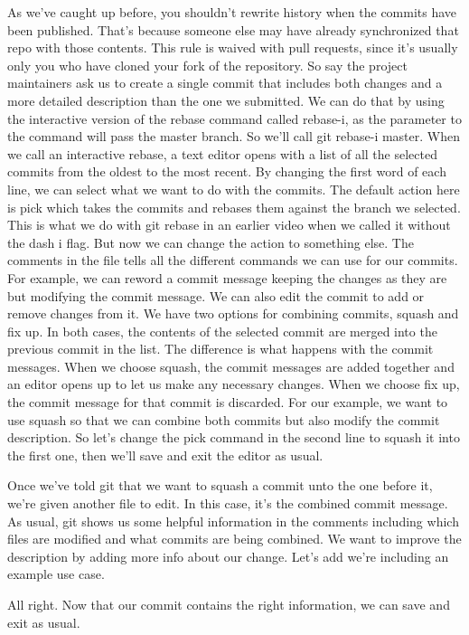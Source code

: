 	
	As we've caught up before, you shouldn't rewrite history when the commits have been published. That's because someone else may have already synchronized that repo with those contents. This rule is waived with pull requests, since it's usually only you who have cloned your fork of the repository. So say the project maintainers ask us to create a single commit that includes both changes and a more detailed description than the one we submitted. We can do that by using the interactive version of the rebase command called rebase-i, as the parameter to the command will pass the master branch. So we'll call git rebase-i master. When we call an interactive rebase, a text editor opens with a list of all the selected commits from the oldest to the most recent. By changing the first word of each line, we can select what we want to do with the commits. The default action here is pick which takes the commits and rebases them against the branch we selected. This is what we do with git rebase in an earlier video when we called it without the dash i flag. But now we can change the action to something else. The comments in the file tells all the different commands we can use for our commits. For example, we can reword a commit message keeping the changes as they are but modifying the commit message. We can also edit the commit to add or remove changes from it. We have two options for combining commits, squash and fix up. In both cases, the contents of the selected commit are merged into the previous commit in the list. The difference is what happens with the commit messages. When we choose squash, the commit messages are added together and an editor opens up to let us make any necessary changes. When we choose fix up, the commit message for that commit is discarded. For our example, we want to use squash so that we can combine both commits but also modify the commit description. So let's change the pick command in the second line to squash it into the first one, then we'll save and exit the editor as usual.
	
	Once we've told git that we want to squash a commit unto the one before it, we're given another file to edit. In this case, it's the combined commit message. As usual, git shows us some helpful information in the comments including which files are modified and what commits are being combined. We want to improve the description by adding more info about our change. Let's add we're including an example use case.
	
	All right. Now that our commit contains the right information, we can save and exit as usual.
	
